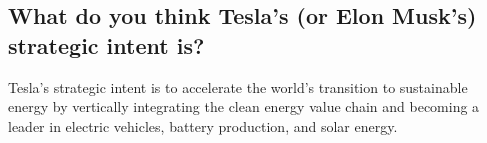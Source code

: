\documentclass[UTF8,a4paper,AutoFakeBold,AutoFakeSlant]{article}
\begin{document}
\subsection{What do you think Tesla’s (or Elon Musk’s) strategic intent is?}

Tesla's strategic intent is to accelerate the world's transition to sustainable energy by vertically integrating the clean energy value chain and becoming a leader in electric vehicles, battery production, and solar energy.


% 
% 
% 
\end{document}
